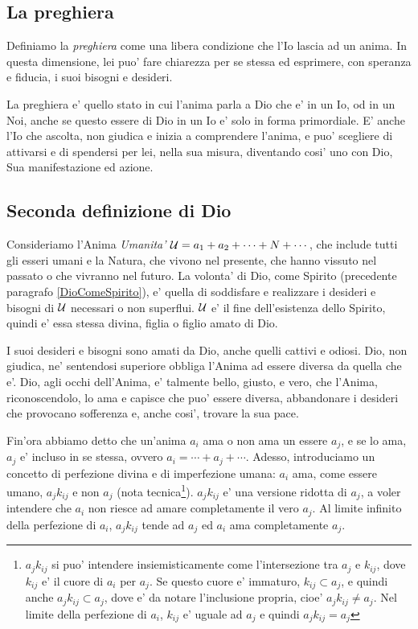 \subsection{La preghiera}

Definiamo la \emph{preghiera} come una libera condizione che l'Io lascia ad un anima. In questa dimensione, lei puo' fare chiarezza per se stessa ed esprimere, con speranza e fiducia, i suoi bisogni e desideri. 

La preghiera e' quello stato in cui l'anima parla a Dio che e' in un Io, od in un Noi, anche se questo essere di Dio in un Io e' solo in forma primordiale. E' anche l'Io che ascolta, non giudica e inizia a comprendere l'anima, e puo' scegliere di attivarsi e di spendersi per lei, nella sua misura, diventando cosi' uno con Dio, Sua manifestazione ed azione.


\subsection{Seconda definizione di Dio}
\label{PureSoulAsGod}

Consideriamo l'Anima \emph{Umanita'} $\mathcal{U}=a_1+a_2+\cdots+N+\cdots$, che include tutti gli esseri umani e la Natura, che vivono nel presente, che hanno vissuto nel passato o che vivranno nel futuro. La volonta' di Dio, come Spirito (precedente paragrafo \ref{DioComeSpirito}), e' quella di soddisfare e realizzare i desideri e bisogni di $\mathcal{U}$ necessari o non superflui. $\mathcal{U}$ e' il fine dell'esistenza dello Spirito, quindi e' essa stessa divina, figlia o figlio amato di Dio. 

I suoi desideri e bisogni sono amati da Dio, anche quelli cattivi e odiosi. Dio, non giudica, ne' sentendosi superiore obbliga l'Anima ad essere diversa da quella che e'. Dio, agli occhi dell'Anima, e' talmente bello, giusto, e vero, che l'Anima, riconoscendolo, lo ama e capisce che puo' essere diversa, abbandonare i desideri che provocano sofferenza e, anche cosi', trovare la sua pace.

Fin'ora abbiamo detto che un'anima $a_i$ ama o non ama un essere $a_j$, e se lo ama, $a_j$ e' incluso in se stessa, ovvero $a_i=\cdots+a_j+\cdots$. Adesso, introduciamo un concetto di perfezione divina e di imperfezione umana: $a_i$ ama, come essere umano, $a_jk_{ij}$ e non $a_j$ (nota tecnica\footnote{$a_jk_{ij}$ si puo' intendere insiemisticamente come l'intersezione tra $a_j$ e $k_{ij}$, dove $k_{ij}$ e' il cuore di $a_i$ per $a_j$. Se questo cuore e' immaturo, $k_{ij} \subset a_j$, e quindi anche $a_jk_{ij}\subset a_j$, dove e' da notare l'inclusione propria, cioe' $a_jk_{ij}\ne a_j$. Nel limite della perfezione di $a_i$, $k_{ij}$ e' uguale ad $a_j$ e quindi $a_jk_{ij}=a_j$}). $a_jk_{ij}$ e' una versione ridotta di $a_j$, a voler intendere che $a_i$ non riesce ad amare completamente il vero $a_j$. Al limite infinito della perfezione di $a_i$, $a_jk_{ij}$ tende ad $a_j$ ed $a_i$ ama completamente $a_j$.


